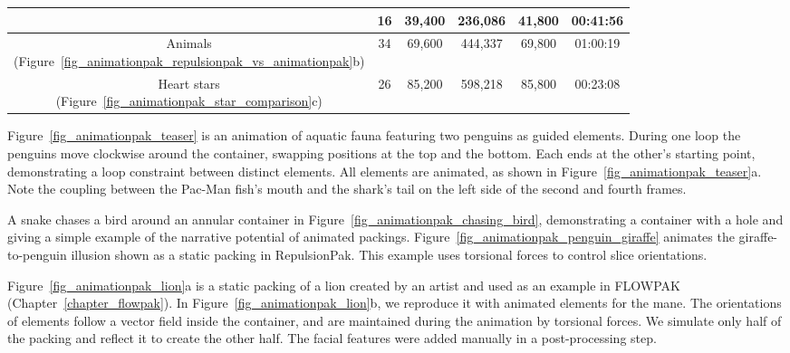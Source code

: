 \begin{table}[t!]
\begin{tabular}{|c|c|c|c|c|c|}
& 16         & 39,400             & 236,086            & 41,800   & 00:41:56        
\\ \hline
\makecell{Animals            \\ (Figure~\ref{fig_animationpak_repulsionpak_vs_animationpak}b)}  
& 34         & 69,600             & 444,337            & 69,800   & 01:00:19        
\\ \hline
\makecell{Heart stars         \\ (Figure~\ref{fig_animationpak_star_comparison}c)}  
& 26         & 85,200             & 598,218            & 85,800   & 00:23:08        
\\ \hline
\end{tabular}
\end{table}



Figure~\ref{fig_animationpak_teaser} is an animation of aquatic fauna featuring two
penguins as guided elements.  During one loop the penguins move clockwise
around the container, swapping positions at the top and the bottom.
Each ends at the other's starting point, demonstrating a loop constraint
between distinct elements.  All elements are animated, as shown in 
Figure~\ref{fig_animationpak_teaser}a.  Note the coupling between the Pac-Man fish's
mouth and the shark's tail on the left side of the second and fourth frames.

A snake chases a bird around an annular container in 
Figure~\ref{fig_animationpak_chasing_bird}, demonstrating a container with a hole
and giving a simple example of the narrative potential of animated
packings.  Figure~\ref{fig_animationpak_penguin_giraffe} animates the giraffe-to-penguin
illusion shown as a static packing in RepulsionPak.  This example
uses torsional forces to control slice orientations.


Figure~\ref{fig_animationpak_lion}a is a static packing of a lion created by an artist and
used as an example in FLOWPAK (Chapter~\ref{chapter_flowpak}).  In Figure~\ref{fig_animationpak_lion}b,
we reproduce it with animated elements for the mane.
The orientations of elements follow a vector field inside
the container, and are maintained during the animation by 
torsional forces.
We simulate only half of the packing and reflect it to create the other half.
The facial features were added manually in a post-processing step.

